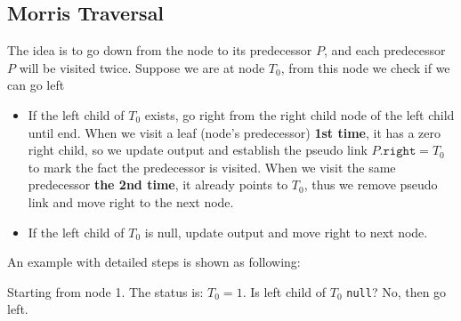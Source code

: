 \subsection{Morris Traversal}
The idea is to go down from the node to its predecessor $P$, and each predecessor $P$ will be visited twice. Suppose we are at node $T_0$, from this node we check if we can go left
\begin{itemize}
\item If the left child of $T_0$ exists, go right from the right child node of the left child until end. When we visit a leaf (node's predecessor) \textbf{1st time}, it has a zero right child, so we update output and establish the pseudo link $P.\texttt{right} = T_0$ to mark the fact the predecessor is visited. When we visit the same predecessor \textbf{the 2nd time}, it already points to $T_0$, thus we remove pseudo link and move right to the next node.
\item If the left child of $T_0$ is null, update output and move right to next node.
\end{itemize}
An example with detailed steps is shown as following:
\begin{figure}[H]
\end{figure}
Starting from node 1. The status is: $T_0 = 1$. Is left child of $T_0$ \texttt{null}? No, then go left. 
\begin{figure}[H]
\end{figure}
